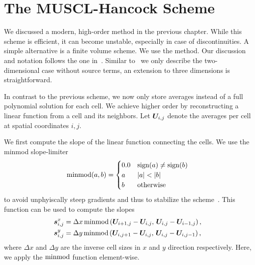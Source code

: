 \section{The MUSCL-Hancock Scheme}\label{sec:muscl}
We discussed a modern, high-order \dg{} method in the previous chapter.
While this scheme is efficient, it can become unstable, especially in case of discontinuities.
A simple alternative is a finite volume scheme.
We use the \muscl{} method\cite{vanLeer1979towards}.
Our discussion and notation follows the one in~\cite{toro2009riemann}.
Similar to~\cite{toro2009riemann} we only describe the two-dimensional case without source terms, an extension to three dimensions is straightforward.

In contrast to the previous \dg{} scheme, we now only store averages instead of a full polynomial solution for each cell.
We achieve higher order by reconstructing a linear function from a cell and its neighbors.
Let $\cellAvg$ denote the averages per cell at spatial coordinates $i,j$.

We first compute the slope of the linear function connecting the cells.
We use the minmod slope-limiter
\begin{equation}
  \label{eq:minmod}
  \minmod(a, b) =
  \begin{cases}
    0.0 & \sign(a) \neq \sign(b) \\
      a & \vert a \vert < \vert b \vert \\
      b & \text{otherwise}
  \end{cases}
\end{equation}
to avoid unphyiscally steep gradients and thus to stabilize the scheme~\cite{leVeque2002finite}.
This function can be used to compute the slopes
\begin{align}\label{eq:slopes}
  \begin{split}
   \slope{x} &=  \Delta x \minmod \left( \cellAvg[i+1,j] - \cellAvg[i,j], \, \cellAvg[i,j] - \cellAvg[i-1, j] \right),\\ 
   \slope{y} &=  \Delta y \minmod \left( \cellAvg[i,j+1] - \cellAvg[i,j], \, \cellAvg[i,j] - \cellAvg[i, j-1] \right),
   \end{split}
\end{align}
where $\Delta x$ and $\Delta y$ are the inverse cell sizes in $x$ and $y$ direction respectively.
Here, we apply the $\minmod$ function element-wise.

